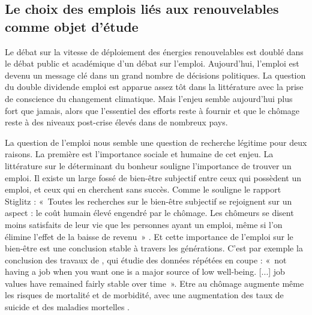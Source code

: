 \subsection{Le choix des emplois liés aux renouvelables comme objet d’étude}
Le débat sur la vitesse de déploiement des énergies renouvelables est doublé dans le débat public et académique d’un débat sur l’emploi. Aujourd’hui, l’emploi est devenu un message clé dans un grand nombre de décisions politiques. 
La question du double dividende emploi est apparue assez tôt dans la littérature avec la prise de conscience du changement climatique. Mais l’enjeu semble aujourd’hui plus fort que jamais, alors que l’essentiel des efforts reste à fournir et que le chômage reste à des niveaux post-crise élevés dans de nombreux pays.

La question de l’emploi nous semble une question de recherche légitime pour deux raisons. La première est l'importance sociale et humaine de cet enjeu. La littérature sur le déterminant du bonheur souligne l’importance de trouver un emploi. Il existe un large fossé de bien-être subjectif entre ceux qui possèdent un emploi, et ceux qui en cherchent sans succès. Comme le souligne le rapport Stiglitz : 
«~Toutes les recherches sur le bien-être subjectif se rejoignent sur un aspect : le coût humain élevé engendré par le chômage. Les chômeurs se disent moins satisfaits de leur vie que les personnes ayant un emploi, même si l'on élimine l'effet de la baisse de revenu~» \citep[p. 166]{Stiglitz2009}.
Et cette importance de l’emploi sur le bien-être est une conclusion stable à travers les générations. C'est par exemple la conclusion des travaux de \citet{Clark2009}, qui étudie des données répétées en coupe :
«~not having a job when you want one is a major source of low well-being. [...] job values have remained fairly stable over time~». 
Etre au chômage augmente même les risques de mortalité et de morbidité, avec une augmentation des taux de suicide et des maladies mortelles \citep{Gerdtham2003}.


